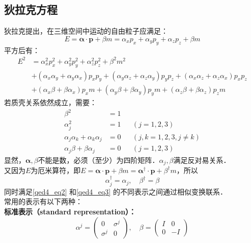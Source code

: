 \subsection{狄拉克方程}
狄拉克提出，在三维空间中运动的自由粒子应满足：
\begin{equation}
E=\boldsymbol{\alpha} \cdot \boldsymbol{p}+\beta m=\alpha_{x} p_{x}+\alpha_{y} p_{y}+\alpha_{z} p_{z}+\beta m
\end{equation}
平方后有：\begin{equation}
\begin{aligned}
E^{2} &=\alpha_{x}^{2} p_{x}^{2}+\alpha_{y}^{2} p_{y}^{2}+\alpha_{z}^{2} p_{z}^{2}+\beta^{2} m^{2} \\
&+\left(\alpha_{x} \alpha_{y}+\alpha_{y} \alpha_{x}\right) p_{x} p_{y}+\left(\alpha_{y} \alpha_{z}+\alpha_{z} \alpha_{y}\right) p_{y} p_{z}+\left(\alpha_{x} \alpha_{z}+\alpha_{z} \alpha_{x}\right) p_{x} p_{z} \\
&+\left(\alpha_{x} \beta+\beta \alpha_{x}\right) p_{x} m+\left(\alpha_{y} \beta+\beta \alpha_{y}\right) p_{y} m+\left(\alpha_{z} \beta+\beta \alpha_{z}\right) p_{z} m
\end{aligned}
\end{equation}
若质壳关系依然成立，需要：
\begin{equation}\label{qed4_eq2}
\begin{aligned}
\beta^{2} &=1 & & \\
\alpha_j^{2} &=1 & &(j=1,2,3) \\
\alpha_j \alpha_k+\alpha_k \alpha_j &=0 & &(j, k=1,2,3, j \neq k) \\
\alpha_j \beta+\beta \alpha_j &=0 & &(j=1,2,3)
\end{aligned}
\end{equation}
显然，$\boldsymbol{\alpha}, \beta$不能是数，必须（至少）为四阶矩阵．$\alpha_j, \beta$满足反对易关系．
\\又因为$E$为厄米算符，即$E=\boldsymbol{\alpha} \cdot \boldsymbol{p}+\beta m=\boldsymbol{\alpha}^\dagger \cdot \boldsymbol{p}+\beta^\dagger m$，所以
\begin{equation}\label{qed4_eq3}
\alpha_j^{\dagger}=\alpha_j, \quad \beta^{\dagger}=\beta
\end{equation}
同时满足\autoref{qed4_eq2} 和\autoref{qed4_eq3} 的不同表示之间通过相似变换联系．
\\常用的表示有以下两种：
\\\textbf{标准表示（standard representation）：}
\begin{equation}
\alpha^{j}=\left(\begin{array}{cc}
0 & \sigma^{j} \\
\sigma^{j} & 0
\end{array}\right), \quad \beta=\left(\begin{array}{rr}
I & 0 \\
0 & -I
\end{array}\right)
\end{equation}
